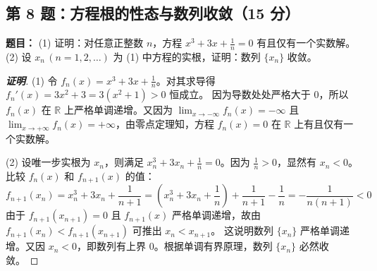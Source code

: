 \documentclass[11pt,a4paper]{article}
\begin{document}
	\begin{tcolorbox}[examstyle]
		\subsection*{第 8 题：方程根的性态与数列收敛（15 分）}
		\textbf{题目：} 
		(1) 证明：对任意正整数 $n$，方程 $x^3 + 3x + \frac{1}{n} = 0$ 有且仅有一个实数解。 \\
		(2) 设 $x_n \, (n = 1,2,\dots)$ 为 (1) 中方程的实根，证明：数列 $\{x_n\}$ 收敛。
		
		\begin{proof}[\textbf{证明}]
			(1) 令 $f_n(x) = x^3 + 3x + \frac{1}{n}$。对其求导得 $f_n'(x) = 3x^2 + 3 = 3(x^2+1) > 0$ 恒成立。
			因为导数处处严格大于 $0$，所以 $f_n(x)$ 在 $\mathbb{R}$ 上严格单调递增。又因为 $\lim_{x \to -\infty} f_n(x) = -\infty$ 且 $\lim_{x \to +\infty} f_n(x) = +\infty$，由零点定理知，方程 $f_n(x) = 0$ 在 $\mathbb{R}$ 上有且仅有一个实数解。
			
			(2) 设唯一步实根为 $x_n$，则满足 $x_n^3 + 3x_n + \frac{1}{n} = 0$。因为 $\frac{1}{n} > 0$，显然有 $x_n < 0$。
			比较 $f_n(x)$ 和 $f_{n+1}(x)$ 的值：
			$$ f_{n+1}(x_n) = x_n^3 + 3x_n + \frac{1}{n+1} = \left( x_n^3 + 3x_n + \frac{1}{n} \right) + \frac{1}{n+1} - \frac{1}{n} = - \frac{1}{n(n+1)} < 0 $$
			由于 $f_{n+1}(x_{n+1}) = 0$ 且 $f_{n+1}(x)$ 严格单调递增，故由 $f_{n+1}(x_n) < f_{n+1}(x_{n+1})$ 可推出 $x_n < x_{n+1}$。
			这说明数列 $\{x_n\}$ 严格单调递增。又因 $x_n < 0$，即数列有上界 $0$。根据单调有界原理，数列 $\{x_n\}$ 必然收敛。
		\end{proof}
	\end{tcolorbox}
	
\end{document}
